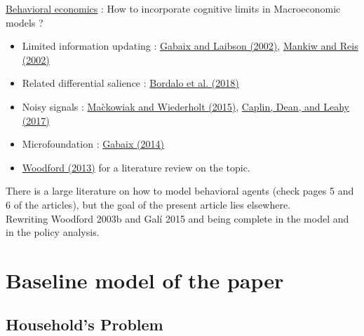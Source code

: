 \documentclass{beamer}
\newcommand\ReduceFont{\fontsize{10}{7.2}\selectfont}
\begin{document}
\begin{frame}{\subsecname}
    \underline{Behavioral economics} : How to incorporate cognitive limits in Macroeconomic models ?
    \begin{itemize}
        \item Limited information updating : \hyperlink{https://pages.stern.nyu.edu/~xgabaix/papers/shrouded.pdf}{Gabaix and Laibson (2002)}, \hyperlink{https://academic.oup.com/qje/article-abstract/117/4/1295/1875955?redirectedFrom=fulltext}{Mankiw and Reis (2002)}
        \item Related differential salience : \hyperlink{https://scholar.harvard.edu/files/shleifer/files/bordalo_et_al-2018-the_journal_of_finance.pdf}{Bordalo et al. (2018)}
        \item Noisy signals : \hyperlink{https://www.ecb.europa.eu/pub/pdf/scpwps/ecbwp1331.pdf}{Ma\`ckowiak and Wiederholt (2015)}, \hyperlink{http://www.columbia.edu/~md3405/Working_Paper_20.pdf}{Caplin, Dean, and Leahy (2017)}
        \item Microfoundation : \hyperlink{https://pages.stern.nyu.edu/~xgabaix/papers/sparsebr.pdf}{Gabaix (2014)}
        \item \underline{\hyperlink{https://www.nber.org/papers/w19368}{Woodford (2013)}} for a literature review on the topic.
    \end{itemize}
    There is a large literature on how to model behavioral agents (check pages 5 and 6 of the articles), but the goal of the present article lies elsewhere.\\
    Rewriting Woodford 2003b and Galí 2015 and being complete in the model and in the policy analysis.
\end{frame}


\section{Baseline model of the paper}
\begin{frame}
    \ReduceFont
\end{frame}

\begin{frame}
    \tableofcontents[currentsection, hideothersubsections, sections=\value{section}]
\end{frame}

\subsection{Household's Problem}
\end{document}
